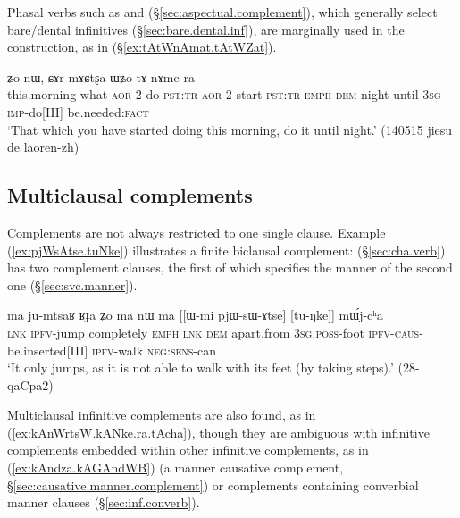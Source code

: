 Phasal verbs such as  and  (§\ref{sec:aspectual.complement}), which generally select bare/dental infinitives (§\ref{sec:bare.dental.inf}), are marginally used in the construction, as in (§\ref{ex:tAtWnAmat.tAtWZat}).  
 
\begin{exe}
\ex \label{ex:tAtWnAmat.tAtWZat}
  ʑo nɯ, ɕɤr mɤɕtʂa ɯʑo tɤ-nɤme ra \\
 this.morning what \textsc{aor}-2-do-\textsc{pst}:\textsc{tr} \textsc{aor}-2-start-\textsc{pst}:\textsc{tr} \textsc{emph} \textsc{dem} night until \textsc{3sg} \textsc{imp}-do[III] be.needed:\textsc{fact} \\
\glt `That which you have started doing this morning, do it until night.' (140515 jiesu de laoren-zh)
\end{exe}

\subsection{Multiclausal complements} \label{sec:multiclausal.complements}
Complements are not always restricted to one single clause. Example (\ref{ex:pjWsAtse.tuNke}) illustrates a finite biclausal complement:  (§\ref{sec:cha.verb}) has two complement clauses, the first of which  specifies the manner of the second one (§\ref{sec:svc.manner}).

\begin{exe}
\ex \label{ex:pjWsAtse.tuNke}
\gll ma ju-mtsaʁ ʁɟa ʑo ma nɯ ma [[ɯ-mi pjɯ-sɯ-ɤtse] [tu-ŋke]] mɯ́j-cʰa\\
\textsc{lnk} \textsc{ipfv}-jump completely \textsc{emph} \textsc{lnk} \textsc{dem} apart.from \textsc{3sg}.\textsc{poss}-foot \textsc{ipfv}-\textsc{caus}-be.inserted[III] \textsc{ipfv}-walk \textsc{neg}:\textsc{sens}-can \\
\glt `It only jumps, as it is not able to walk with its feet (by taking steps).'  (28-qaCpa2)
\end{exe} 

Multiclausal infinitive complements are also found, as in (\ref{ex:kAnWrtsW.kANke.ra.tAcha}), though they are ambiguous with infinitive complements embedded within other infinitive complements, as in (\ref{ex:kAndza.kAGAndWB}) (a manner causative complement, §\ref{sec:causative.manner.complement}) or complements containing converbial manner clauses (§\ref{sec:inf.converb}).


